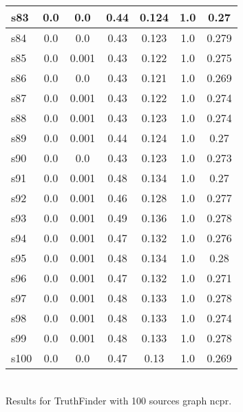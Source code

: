 \documentclass{article}
\begin{document}
\begin{tabular}{|l|c|c|c|c|c|c|}
\hline
s83 &0.0 & 0.0 & 0.44 & 0.124 & 1.0 & 0.27\\
\hline
s84 &0.0 & 0.0 & 0.43 & 0.123 & 1.0 & 0.279\\
\hline
s85 &0.0 & 0.001 & 0.43 & 0.122 & 1.0 & 0.275\\
\hline
s86 &0.0 & 0.0 & 0.43 & 0.121 & 1.0 & 0.269\\
\hline
s87 &0.0 & 0.001 & 0.43 & 0.122 & 1.0 & 0.274\\
\hline
s88 &0.0 & 0.001 & 0.43 & 0.123 & 1.0 & 0.274\\
\hline
s89 &0.0 & 0.001 & 0.44 & 0.124 & 1.0 & 0.27\\
\hline
s90 &0.0 & 0.0 & 0.43 & 0.123 & 1.0 & 0.273\\
\hline
s91 &0.0 & 0.001 & 0.48 & 0.134 & 1.0 & 0.27\\
\hline
s92 &0.0 & 0.001 & 0.46 & 0.128 & 1.0 & 0.277\\
\hline
s93 &0.0 & 0.001 & 0.49 & 0.136 & 1.0 & 0.278\\
\hline
s94 &0.0 & 0.001 & 0.47 & 0.132 & 1.0 & 0.276\\
\hline
s95 &0.0 & 0.001 & 0.48 & 0.134 & 1.0 & 0.28\\
\hline
s96 &0.0 & 0.001 & 0.47 & 0.132 & 1.0 & 0.271\\
\hline
s97 &0.0 & 0.001 & 0.48 & 0.133 & 1.0 & 0.278\\
\hline
s98 &0.0 & 0.001 & 0.48 & 0.133 & 1.0 & 0.274\\
\hline
s99 &0.0 & 0.001 & 0.48 & 0.133 & 1.0 & 0.278\\
\hline
s100 &0.0 & 0.0 & 0.47 & 0.13 & 1.0 & 0.269\\
\hline
\end{tabular}\\

\noindent Results for TruthFinder with 100 sources graph ncpr.
\end{document}

